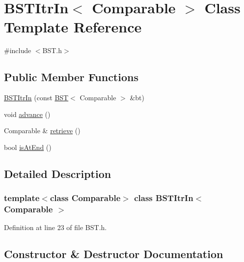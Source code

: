 \hypertarget{class_b_s_t_itr_in}{}\section{B\+S\+T\+Itr\+In$<$ Comparable $>$ Class Template Reference}
\label{class_b_s_t_itr_in}


{\ttfamily \#include $<$B\+S\+T.\+h$>$}

\subsection*{Public Member Functions}
\begin{DoxyCompactItemize}
\item 
\hyperlink{class_b_s_t_itr_in_ac836e2f560fed9cc7ef8e5431a2836cc}{B\+S\+T\+Itr\+In} (const \hyperlink{class_b_s_t}{B\+ST}$<$ Comparable $>$ \&bt)
\item 
void \hyperlink{class_b_s_t_itr_in_ac772d3ebbac748c5f8cf9bc659f2e32c}{advance} ()
\item 
Comparable \& \hyperlink{class_b_s_t_itr_in_ac7ac215c1247bd25fc1fdb8053826a32}{retrieve} ()
\item 
bool \hyperlink{class_b_s_t_itr_in_a6f9a43217862c263a9bf15b9a08b889a}{is\+At\+End} ()
\end{DoxyCompactItemize}


\subsection{Detailed Description}
\subsubsection*{template$<$class Comparable$>$\newline
class B\+S\+T\+Itr\+In$<$ Comparable $>$}



Definition at line 23 of file B\+S\+T.\+h.



\subsection{Constructor \& Destructor Documentation}
\hypertarget{class_b_s_t_itr_in_ac836e2f560fed9cc7ef8e5431a2836cc}{}\label{class_b_s_t_itr_in_ac836e2f560fed9cc7ef8e5431a2836cc} 
